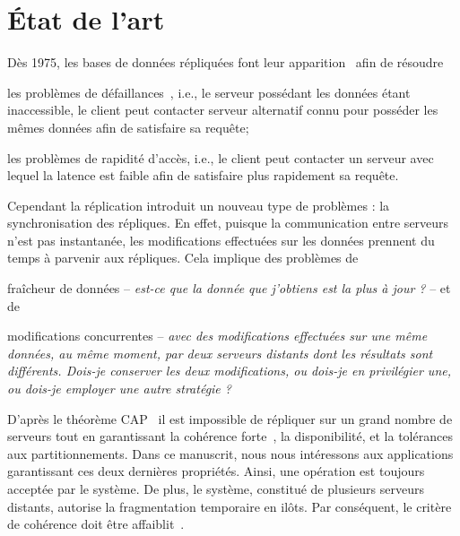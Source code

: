 

\section{État de l'art}
\label{repl:sec:stateoftheart}

Dès 1975, les bases de données répliquées font leur
apparition~\cite{johnson1975maintenance} afin de résoudre
\begin{inparaenum}[(i)]
\item les problèmes de défaillances~\cite{alsberg1976principle}, i.e., le
  serveur possédant les données étant inaccessible, le client peut contacter
  serveur alternatif connu pour posséder les mêmes données afin de satisfaire sa
  requête;
\item les problèmes de rapidité d'accès, i.e., le client peut contacter un
  serveur avec lequel la latence est faible afin de satisfaire plus rapidement
  sa requête.
\end{inparaenum}

Cependant la réplication introduit un nouveau type de problèmes : la
synchronisation des répliques. En effet, puisque la communication entre serveurs
n'est pas instantanée, les modifications effectuées sur les données prennent du
temps à parvenir aux répliques. Cela implique des problèmes de
\begin{inparaenum}[(i)]
\item fraîcheur de données -- \emph{est-ce que la donnée que j'obtiens est la
    plus à jour ?} -- et de
\item modifications concurrentes -- \emph{avec des modifications effectuées sur
    une même données, au même moment, par deux serveurs distants dont les
    résultats sont différents. Dois-je conserver les deux modifications, ou
    dois-je en privilégier une, ou dois-je employer une autre stratégie ?}
\end{inparaenum}


D'après le théorème CAP~\cite{brewer2012cap, gilbert2002brewer} il est
impossible de répliquer sur un grand nombre de serveurs tout en garantissant la
cohérence forte~\cite{herlihy1990linearizability}, la disponibilité, et la
tolérances aux partitionnements. Dans ce manuscrit, nous nous intéressons aux
applications garantissant ces deux dernières propriétés. Ainsi, une opération
est toujours acceptée par le système. De plus, le système, constitué de
plusieurs serveurs distants, autorise la fragmentation temporaire en
ilôts. Par conséquent, le critère de cohérence doit être
affaiblit~\cite{bailis2013eventual, shapiro2011conflict}.

